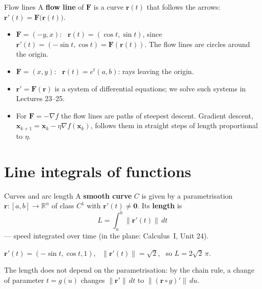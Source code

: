 \documentclass[10pt]{wosm-slides}
\newcommand{\R}{\mathbb{R}}
\newcommand{\norm}[1]{\lVert #1 \rVert}
\newcommand{\vx}{\mathbf{x}}
\newcommand{\vr}{\mathbf{r}}
\newcommand{\vF}{\mathbf{F}}
\begin{document}
\begin{frame}{Flow lines}
  A \textbf{flow line} of $\vF$ is a curve $\vr(t)$ that follows the arrows: $\vr'(t) = \vF\bigl(\vr(t)\bigr)$.
  \pause
  \begin{itemize}
    \item $\vF = (-y, x)$: \ $\vr(t) = (\cos t, \sin t)$, since $\vr'(t) = (-\sin t, \cos t) = \vF(\vr(t))$.
      The flow lines are circles around the origin.
    \item $\vF = (x, y)$: \ $\vr(t) = e^t (a, b)$: rays leaving the origin.
  \end{itemize}
  \pause
  \begin{itemize}
    \item $\vr' = \vF(\vr)$ is a system of differential equations; we solve such systems in Lectures
      23--25.
    \item For $\vF = -\nabla f$ the flow lines are paths of steepest descent. Gradient descent,
      $\vx_{k+1} = \vx_k - \eta\nabla f(\vx_k)$, follows them in straight steps of length proportional
      to $\eta$.
  \end{itemize}
\end{frame}

\section{Line integrals of functions}

\begin{frame}{Curves and arc length}
  A \textbf{smooth curve} $C$ is given by a parametrisation $\vr\colon [a, b] \to \R^n$ of class $C^1$
  with $\vr'(t) \ne \mathbf 0$. Its \textbf{length} is
  \[ L = \int_a^b \norm{\vr'(t)}\, dt \]
  --- speed integrated over time (in the plane: Calculus~I, Unit 24).
  \pause
  \begin{example}[The helix $\vr(t) = (\cos t, \sin t, t)$, \ $0 \le t \le 2\pi$]
    $\vr'(t) = (-\sin t, \cos t, 1)$, \ $\norm{\vr'(t)} = \sqrt2$, \ so $L = 2\sqrt2\, \pi$.
  \end{example}
  \pause
  {\small The length does not depend on the parametrisation: by the chain rule, a change of
  parameter $t = g(u)$ changes $\norm{\vr'}\, dt$ to $\norm{(\vr \circ g)'}\, du$.\par}
\end{frame}
\end{document}
